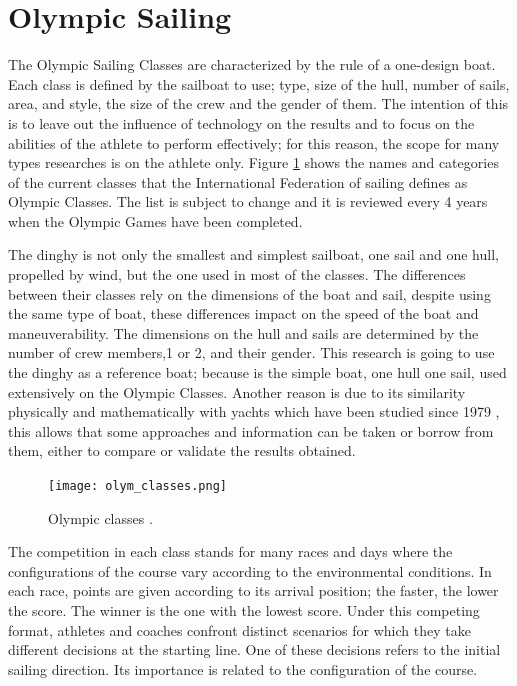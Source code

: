 \section {Olympic Sailing} \label{sec:olympic classes}
The Olympic Sailing Classes are characterized by the rule of a one-design boat. Each class is defined by the sailboat to use; type, size of the hull, number of sails, area, and style, the size of the crew and the gender of them.  The intention of this is to leave out the influence of technology on the results and to focus on the abilities of the athlete to perform effectively; for this reason, the scope for many types researches is on the athlete only. Figure \ref{fig:olymp_cla} shows the names and categories of the current classes that the International Federation of sailing defines as Olympic Classes. The list is subject to change and it is reviewed every 4 years when the Olympic Games have been completed.\par 
The dinghy is not only the smallest and simplest sailboat, one sail and one hull, propelled by wind, but the one used in most of the classes. The differences between their classes rely on the dimensions of the boat and sail, despite using the same type of boat, these differences impact on the speed of the boat and maneuverability. The dimensions on the hull and sails are determined by the number of crew members,1 or 2, and their gender. This research is going to use the dinghy as a reference boat; because is the simple boat, one hull one sail, used extensively on the Olympic Classes. Another reason is due to its similarity physically and mathematically with yachts which have been studied since 1979 \cite{marchajaereo1979}, this allows that some approaches and information can be taken or borrow from them, either to compare or validate the results obtained.\par 

\begin{figure}[ht]
\centering
 \texttt{[image: olym\_classes.png]}
  \caption{Olympic classes \cite{sailoly}.}
\label{fig:olymp_cla} 
\end{figure}

The competition in each class stands for many races and days where the configurations of the course vary according to the environmental conditions. In each race, points are given according to its arrival position; the faster, the lower the score. The winner is the one with the lowest score. Under this competing format, athletes and coaches confront distinct scenarios for which they take different decisions at the starting line. One of these decisions refers to the initial sailing direction. Its importance is related to the configuration of the course.\par 

